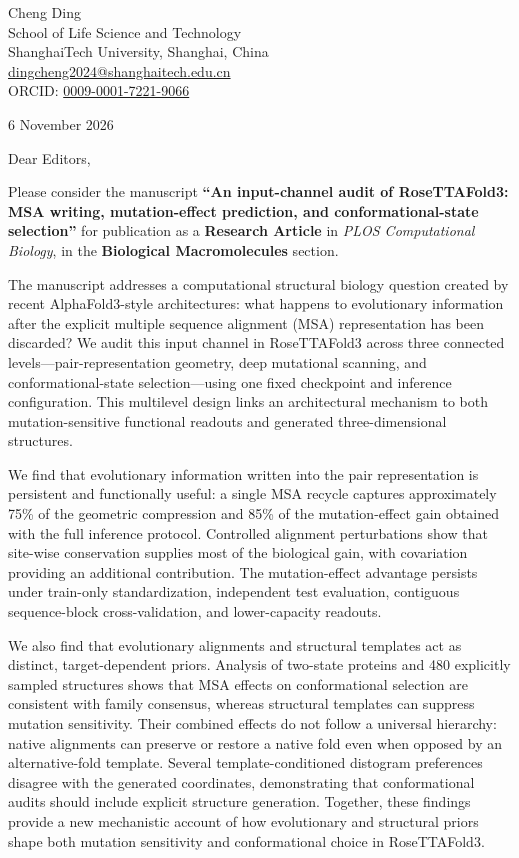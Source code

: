 \documentclass[11pt,a4paper]{article}
\begin{document}
Cheng Ding\\
School of Life Science and Technology\\
ShanghaiTech University, Shanghai, China\\
\href{mailto:dingcheng2024@shanghaitech.edu.cn}{dingcheng2024@shanghaitech.edu.cn}\\
ORCID: \href{https://orcid.org/0009-0001-7221-9066}{0009-0001-7221-9066}

6 November 2026

Dear Editors,

Please consider the manuscript \textbf{``An input-channel audit of RoseTTAFold3: MSA writing, mutation-effect prediction, and conformational-state selection''} for publication as a \textbf{Research Article} in \textit{PLOS Computational Biology}, in the \textbf{Biological Macromolecules} section.

The manuscript addresses a computational structural biology question created by recent AlphaFold3-style architectures: what happens to evolutionary information after the explicit multiple sequence alignment (MSA) representation has been discarded? We audit this input channel in RoseTTAFold3 across three connected levels---pair-representation geometry, deep mutational scanning, and conformational-state selection---using one fixed checkpoint and inference configuration. This multilevel design links an architectural mechanism to both mutation-sensitive functional readouts and generated three-dimensional structures.

We find that evolutionary information written into the pair representation is persistent and functionally useful: a single MSA recycle captures approximately 75\% of the geometric compression and 85\% of the mutation-effect gain obtained with the full inference protocol. Controlled alignment perturbations show that site-wise conservation supplies most of the biological gain, with covariation providing an additional contribution. The mutation-effect advantage persists under train-only standardization, independent test evaluation, contiguous sequence-block cross-validation, and lower-capacity readouts.

We also find that evolutionary alignments and structural templates act as distinct, target-dependent priors. Analysis of two-state proteins and 480 explicitly sampled structures shows that MSA effects on conformational selection are consistent with family consensus, whereas structural templates can suppress mutation sensitivity. Their combined effects do not follow a universal hierarchy: native alignments can preserve or restore a native fold even when opposed by an alternative-fold template. Several template-conditioned distogram preferences disagree with the generated coordinates, demonstrating that conformational audits should include explicit structure generation. Together, these findings provide a new mechanistic account of how evolutionary and structural priors shape both mutation sensitivity and conformational choice in RoseTTAFold3.
\end{document}
